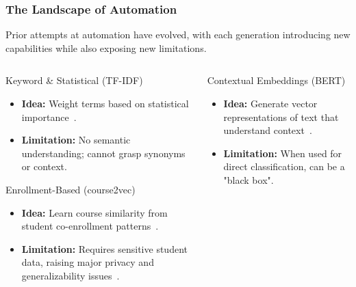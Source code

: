\documentclass[aspectratio=169,10pt]{beamer}
\begin{document}
\begin{frame}
    \frametitle{The Landscape of Automation}
    
    Prior attempts at automation have evolved, with each generation introducing new capabilities while also exposing new limitations.
    
    \fontsize{9}{9}\selectfont
    \begin{columns}[T]
        \begin{column}{0.45\textwidth}
            \begin{block}{Keyword \& Statistical (TF-IDF)}
                \begin{itemize}
                    \item \textbf{Idea:} Weight terms based on statistical importance~\cite{AIZAWA200345}.
                    \item \textbf{Limitation:} No semantic understanding; cannot grasp synonyms or context.
                \end{itemize}
            \end{block}
            
            \begin{block}{Enrollment-Based (course2vec)}
                \begin{itemize}
                    \item \textbf{Idea:} Learn course similarity from student co-enrollment patterns~\cite{PardosCourse2Vec2019}.
                    \item \textbf{Limitation:} Requires sensitive student data, raising major privacy and generalizability issues~\cite{slade10.1177/0002764213479366}.
                \end{itemize}
            \end{block}
        \end{column}

        \begin{column}{0.45\textwidth}
            \begin{block}{Contextual Embeddings (BERT)}
                \begin{itemize}
                    \item \textbf{Idea:} Generate vector representations of text that understand context~\cite{devlin2019bertpretrainingdeepbidirectional, reimers-2019-sentence-bert}.
                    \item \textbf{Limitation:} When used for direct classification, can be a "black box".
                \end{itemize}
            \end{block}
            

\end{column}
\end{columns}
\end{frame}
\end{document}
